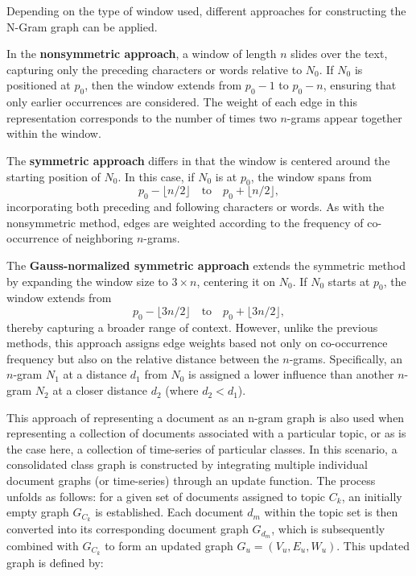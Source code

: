 \documentclass{article}
\begin{document}
Depending on the type of window used, different approaches for constructing the N-Gram graph can be applied.

In the \textbf{nonsymmetric approach}, a window of length \( n \) slides over the text, capturing only the preceding characters or words relative to \( N_0 \). If \( N_0 \) is positioned at \( p_0 \), then the window extends from \( p_0 - 1 \) to \( p_0 - n \), ensuring that only earlier occurrences are considered. The weight of each edge in this representation corresponds to the number of times two \( n \)-grams appear together within the window.

The \textbf{symmetric approach} differs in that the window is centered around the starting position of \( N_0 \). In this case, if \( N_0 \) is at \( p_0 \), the window spans from 
\[
p_0 - \lfloor n/2 \rfloor \quad \text{to} \quad p_0 + \lfloor n/2 \rfloor,
\]
incorporating both preceding and following characters or words. As with the nonsymmetric method, edges are weighted according to the frequency of co-occurrence of neighboring \( n \)-grams.

The \textbf{Gauss-normalized symmetric approach} extends the symmetric method by expanding the window size to \( 3 \times n \), centering it on \( N_0 \). If \( N_0 \) starts at \( p_0 \), the window extends from 
\[
p_0 - \lfloor 3n/2 \rfloor \quad \text{to} \quad p_0 + \lfloor 3n/2 \rfloor,
\]
thereby capturing a broader range of context. However, unlike the previous methods, this approach assigns edge weights based not only on co-occurrence frequency but also on the relative distance between the \( n \)-grams. Specifically, an \( n \)-gram \( N_1 \) at a distance \( d_1 \) from \( N_0 \) is assigned a lower influence than another \( n \)-gram \( N_2 \) at a closer distance \( d_2 \) (where \( d_2 < d_1 \)). \cite{giannakopoulos2008summarization}

This approach of representing a document as an n-gram graph is also used when representing a collection of documents associated with a particular topic, or as is the case here, a collection of time-series of particular classes. In this scenario, a consolidated class graph is constructed by integrating multiple individual document graphs (or time-series) through an update function. The process unfolds as follows: for a given set of documents assigned to topic $C_k$, an initially empty graph $G_{C_k}$ is established. Each document $d_m$ within the topic set is then converted into its corresponding document graph $G_{d_m}$, which is subsequently combined with $G_{C_k}$ to form an updated graph $G_u = (V_u, E_u, W_u)$. This updated graph is defined by:
\end{document}
